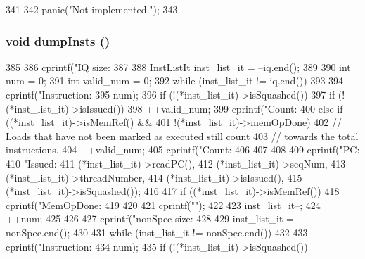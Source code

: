 \begin{DoxyCode}
341 {
342     panic("Not implemented.");
343 }
\end{DoxyCode}
\hypertarget{classBackEnd_1_1InstQueue_a80587b4fe043bbe1995536cb3b361588}{
\subsubsection[{dumpInsts}]{\setlength{\rightskip}{0pt plus 5cm}void dumpInsts ()}}
\label{classBackEnd_1_1InstQueue_a80587b4fe043bbe1995536cb3b361588}



\begin{DoxyCode}
385 {
386     cprintf("IQ size: %
387 
388     InstListIt inst_list_it = --iq.end();
389 
390     int num = 0;
391     int valid_num = 0;
392     while (inst_list_it != iq.end())
393     {
394         cprintf("Instruction:%
395                 num);
396         if (!(*inst_list_it)->isSquashed()) {
397             if (!(*inst_list_it)->isIssued()) {
398                 ++valid_num;
399                 cprintf("Count:%
400             } else if ((*inst_list_it)->isMemRef() &&
401                        !(*inst_list_it)->memOpDone) {
402                 // Loads that have not been marked as executed still count
403                 // towards the total instructions.
404                 ++valid_num;
405                 cprintf("Count:%
406             }
407         }
408 
409         cprintf("PC:%
410                 "Issued:%
411                 (*inst_list_it)->readPC(),
412                 (*inst_list_it)->seqNum,
413                 (*inst_list_it)->threadNumber,
414                 (*inst_list_it)->isIssued(),
415                 (*inst_list_it)->isSquashed());
416 
417         if ((*inst_list_it)->isMemRef()) {
418             cprintf("MemOpDone:%
419         }
420 
421         cprintf("\n");
422 
423         inst_list_it--;
424         ++num;
425     }
426 
427     cprintf("nonSpec size: %
428 
429     inst_list_it = --nonSpec.end();
430 
431     while (inst_list_it != nonSpec.end())
432     {
433         cprintf("Instruction:%
434                 num);
435         if (!(*inst_list_it)->isSquashed()) {
}}}
\end{DoxyCode}

